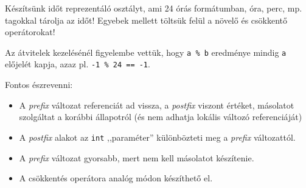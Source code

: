 \documentclass[usenames,dvipsnames,aspectratio=169]{beamer}
\begin{document}
\begin{frame}
    Készítsünk időt reprezentáló osztályt, ami 24 órás formátumban, óra, perc, mp. tagokkal
    tárolja az időt! Egyebek mellett töltsük felül a növelő és csökkentő operátorokat!
    \begin{exampleblock}{}
        \scriptsize
        \vspace{-.2cm}
        
        \vspace{-.2cm}
    \end{exampleblock}
\end{frame}

\begin{frame}
    \begin{exampleblock}{}
        \scriptsize
        
    \end{exampleblock}
    \vfill
    Az átvitelek kezelésénél figyelembe vettük, hogy \texttt{a \% b} eredménye mindig 
    \texttt{a} előjelét kapja, azaz pl. \texttt{-1 \% 24 == -1}.
\end{frame}

\begin{frame}
    \begin{exampleblock}{}
        \scriptsize
        \vspace{-.2cm}
        
        \vspace{-.2cm}
    \end{exampleblock}
\end{frame}

\begin{frame}
    Fontos észrevenni:
    \begin{itemize}
        \item A \emph{prefix} változat referenciát ad vissza, a \emph{postfix} viszont értéket, másolatot szolgáltat a korábbi állapotról (és nem adhatja lokális változó referenciáját)
        \item A \emph{postfix} alakot az \texttt{int} ,,paraméter'' különbözteti 
        meg a \emph{prefix} változattól.
        \item A \emph{prefix} változat gyorsabb, mert nem kell másolatot készítenie.
        \item A csökkentés operátora analóg módon készíthető el.
    \end{itemize}
\end{frame}
\end{document}
